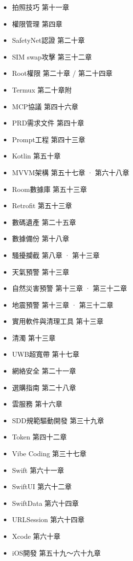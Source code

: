 
\begin{itemize}
  \item 拍照技巧 第十一章
  \item 權限管理 第四章
  \item SafetyNet認證 第二十章
  \item SIM swap攻擊 第三十二章
  \item Root權限 第二十章 / 第二十四章
  \item Termux 第二十章附
  \item MCP協議 第四十六章
  \item PRD需求文件 第四十章
  \item Prompt工程 第四十三章
  \item Kotlin 第五十章
  \item MVVM架構 第五十七章 · 第六十八章
  \item Room數據庫 第五十三章
  \item Retrofit 第五十三章
\end{itemize}


\begin{itemize}
  \item 數碼遺產 第二十五章
  \item 數據備份 第十八章
  \item 騷擾攔截 第八章 · 第十三章
  \item 天氣預警 第十三章
  \item 自然災害預警 第十三章 · 第三十二章
  \item 地震預警 第十三章 · 第三十二章
  \item 實用軟件與清理工具 第十三章
  \item 清濁 第十三章
  \item UWB超寬帶 第十七章
  \item 網絡安全 第二十一章
  \item 選購指南 第二十八章
  \item 雲服務 第十六章
  \item SDD規範驅動開發 第三十九章
  \item Token 第四十二章
  \item Vibe Coding 第三十七章
  \item Swift 第六十一章
  \item SwiftUI 第六十二章
  \item SwiftData 第六十四章
  \item URLSession 第六十四章
  \item Xcode 第六十章
  \item iOS開發 第五十九～六十九章
\end{itemize}

